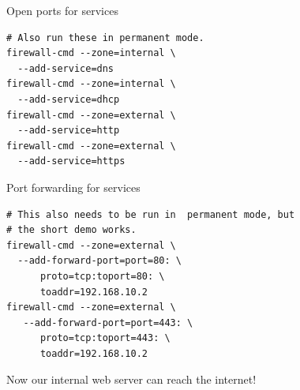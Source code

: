 \documentclass[bigger,aspectratio=169]{beamer}
\begin{document}
\begin{frame}[fragile]{Open ports for services}
\begin{verbatim}
# Also run these in permanent mode.
firewall-cmd --zone=internal \
  --add-service=dns
firewall-cmd --zone=internal \
  --add-service=dhcp
firewall-cmd --zone=external \
  --add-service=http
firewall-cmd --zone=external \
  --add-service=https
\end{verbatim}

\end{frame}

\begin{frame}[fragile]{Port forwarding for services}
\begin{verbatim}
# This also needs to be run in  permanent mode, but
# the short demo works.
firewall-cmd --zone=external \
  --add-forward-port=port=80: \
      proto=tcp:toport=80: \
      toaddr=192.168.10.2
firewall-cmd --zone=external \
   --add-forward-port=port=443: \
      proto=tcp:toport=443: \
      toaddr=192.168.10.2
\end{verbatim}

Now our internal web server can reach the internet!
\end{frame}
\end{document}
